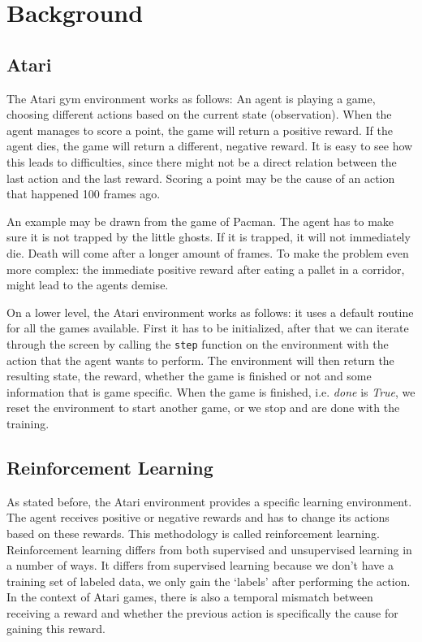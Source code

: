 \documentclass{article}
\begin{document}
\section{Background}

\subsection{Atari}

The Atari gym environment works as follows: An agent is playing a game, choosing different actions based on the current state (observation). When the agent manages to score a point, the game will return a positive reward. If the agent dies, the game will return a different, negative reward. It is easy to see how this leads to difficulties, since there might not be a direct relation between the last action and the last reward. Scoring a point may be the cause of an action that happened 100 frames ago.

An example may be drawn from the game of Pacman. The agent has to make sure it is not trapped by the little ghosts. If it is trapped, it will not immediately die. Death will come after a longer amount of frames. To make the problem even more complex: the immediate positive reward after eating a pallet in a corridor, might lead to the agents demise.

On a lower level, the Atari environment works as follows: it uses a default routine for all the games available. First it has to be initialized, after that we can iterate through the screen by calling the \texttt{step} function on the environment with the action that the agent wants to perform. The environment will then return the resulting state, the reward, whether the game is finished or not and some information that is game specific. When the game is finished, i.e. \textit{done} is \textit{True}, we reset the environment to start another game, or we stop and are done with the training.

\subsection{Reinforcement Learning}

As stated before, the Atari environment provides a specific learning environment. The agent receives positive or negative rewards and has to change its actions based on these rewards. This methodology is called reinforcement learning. Reinforcement learning differs from both supervised and unsupervised learning in a number of ways. It differs from supervised learning because we don't have a training set of labeled data, we only gain the `labels' after performing the action. In the context of Atari games, there is also a temporal mismatch between receiving a reward and whether the previous action is specifically the cause for gaining this reward.
\end{document}
